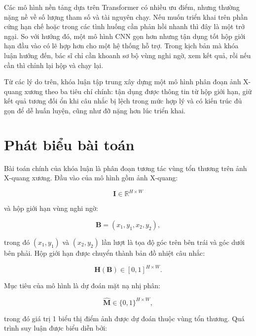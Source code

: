 Các mô hình nền tảng dựa trên Transformer có nhiều ưu điểm, nhưng thường nặng nề về số lượng tham số và tài nguyên chạy. Nếu muốn triển khai trên phần cứng hạn chế hoặc trong các tình huống cần phản hồi nhanh thì đây là một trở ngại. So với hướng đó, một mô hình CNN gọn hơn nhưng tận dụng tốt hộp giới hạn đầu vào có lẽ hợp hơn cho một hệ thống hỗ trợ. Trong kịch bản mà khóa luận hướng đến, bác sĩ chỉ cần khoanh sơ bộ vùng nghi ngờ, xem kết quả, rồi nếu cần thì chỉnh lại hộp và chạy lại.

Từ các lý do trên, khóa luận tập trung xây dựng một mô hình phân đoạn ảnh X-quang xương theo ba tiêu chí chính: tận dụng được thông tin từ hộp giới hạn, giữ kết quả tương đối ổn khi câu nhắc bị lệch trong mức hợp lý và có kiến trúc đủ gọn để dễ huấn luyện, cũng như đỡ nặng hơn lúc triển khai.

\section{Phát biểu bài toán}
\label{sec:phat_bieu}

Bài toán chính của khóa luận là phân đoạn tương tác vùng tổn thương trên ảnh X-quang xương. Đầu vào của mô hình gồm ảnh X-quang:

\begin{equation}
    \mathbf{I}
    \in
    \mathbb{R}^{H\times W}
\end{equation}

và hộp giới hạn vùng nghi ngờ:

\begin{equation}
    \mathbf{B}
    =
    (x_1,y_1,x_2,y_2),
\end{equation}

trong đó $(x_1,y_1)$ và $(x_2,y_2)$ lần lượt là tọa độ góc trên bên trái và góc dưới bên phải. Hộp giới hạn được chuyển thành bản đồ nhiệt câu nhắc:

\begin{equation}
    \mathbf{H}(\mathbf{B})
    \in
    [0,1]^{H\times W}.
\end{equation}

Mục tiêu của mô hình là dự đoán mặt nạ nhị phân:

\begin{equation}
    \widehat{\mathbf{M}}
    \in
    \{0,1\}^{H\times W},
\end{equation}

trong đó giá trị 1 biểu thị điểm ảnh được dự đoán thuộc vùng tổn thương. Quá trình suy luận được biểu diễn bởi:

